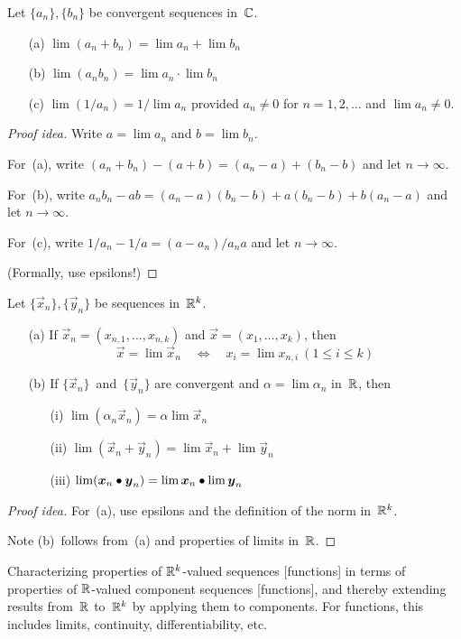 \begin{thm}
Let \(\{a_n\},\{b_n\}\) be convergent sequences in~\(\mathbb{C}\).
\begin{enumerate}[itemsep=0pt]
\item[(a)] \(\lim(a_n+b_n)=\lim a_n+\lim b_n\)
\item[(b)] \(\lim(a_nb_n)=\lim a_n\cdot\lim b_n\)
\item[(c)] \(\lim(1/a_n)=1/\lim a_n\) provided \(a_n\ne0\) for \(n=1,2,\ldots\) and \(\lim a_n\ne0\).
\end{enumerate}
\end{thm}
\begin{proof}[Proof idea]
Write \(a=\lim a_n\) and \(b=\lim b_n\).

For~(a), write \((a_n+b_n)-(a+b)=(a_n-a)+(b_n-b)\) and let \(n\to\infty\).

For~(b), write \(a_nb_n-ab=(a_n-a)(b_n-b)+a(b_n-b)+b(a_n-a)\) and let \(n\to\infty\).

For~(c), write \(1/a_n-1/a=(a-a_n)/a_na\) and let \(n\to\infty\).

(Formally, use epsilons!)
\end{proof}

\begin{thm}[Limits in~\(\R^k\)]
Let \(\{\vec{x}_n\},\{\vec{y}_n\}\) be sequences in~\(\R^k\).
\begin{enumerate}[itemsep=0pt]
\item[(a)] If \(\vec{x}_n=(x_{n,1},\ldots,x_{n,k})\) and \(\vec{x}=(x_1,\ldots,x_k)\), then
\[\vec{x}=\lim\vec{x}_n\quad\iff\quad x_i=\lim x_{n,i}\ (1\le i\le k)\]
\item[(b)] If \(\{\vec{x}_n\}\)~and~\(\{\vec{y}_n\}\) are convergent and \(\alpha=\lim\alpha_n\) in~\(\mathbb{R}\), then
\begin{enumerate}[itemsep=0pt]
\item[(i)] \(\lim(\alpha_n\vec{x}_n)=\alpha\lim\vec{x}_n\)
\item[(ii)] \(\lim(\vec{x}_n+\vec{y}_n)=\lim\vec{x}_n+\lim\vec{y}_n\)
\item[(iii)] \(\lim(\boldsymbol{x}_n\bullet\boldsymbol{y}_n)=\lim\boldsymbol{x}_n\bullet\lim\boldsymbol{y}_n\)
\end{enumerate}
\end{enumerate}
\end{thm}
\begin{proof}[Proof idea]
For~(a), use epsilons and the definition of the norm in~\(\R^k\).

Note (b)~follows from~(a) and properties of limits in~\(\mathbb{R}\).
\end{proof}
\begin{app}
Characterizing properties of \(\R^k\)-valued sequences [functions] in terms of properties of \(\mathbb{R}\)-valued component sequences [functions], and thereby extending results from~\(\mathbb{R}\) to~\(\R^k\) by applying them to components. For functions, this includes limits, continuity, differentiability, etc.
\end{app}

